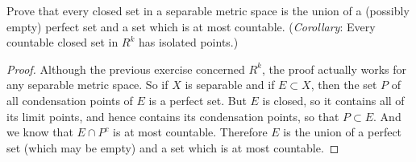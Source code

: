  Prove that every closed set in a separable metric space
is the union of a (possibly empty) perfect set and a set which is at
most countable. ({\em Corollary}: Every countable closed set in $R^k$
has isolated points.)
\begin{proof}
  Although the previous exercise concerned $R^k$, the proof actually
  works for any separable metric space. So if $X$ is separable and if
  $E\subset X$, then the set $P$ of all condensation points of $E$ is
  a perfect set. But $E$ is closed, so it contains all of its limit
  points, and hence contains its condensation points, so that
  $P\subset E$. And we know that $E\cap P^c$ is at most
  countable. Therefore $E$ is the union of a perfect set (which may be
  empty) and a set which is at most countable.
\end{proof}

